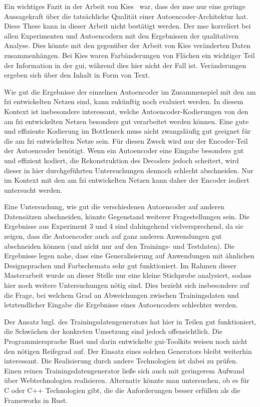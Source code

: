 Ein wichtiges Fazit in der Arbeit von Kies~\cite{kiesEntwicklungUndAnalyse2020} war, dass der \gls{mse} nur eine geringe Aussagekraft über die tatsächliche Qualität einer Autoencoder-Architektur hat. Diese These kann in dieser Arbeit nicht bestätigt werden. Der \gls{mse} korreliert bei allen Experimenten und Autoencodern mit den Ergebnissen der qualitativen Analyse. Dies könnte mit den gegenüber der Arbeit von Kies veränderten Daten zusammenhängen. Bei Kies waren Farbänderungen von Flächen ein wichtiger Teil der Information in der \gls{gui}, während dies hier nicht der Fall ist. Veränderungen ergeben sich über den Inhalt in Form von Text.

Wie gut die Ergebnisse der einzelnen Autoencoder im Zusammenspiel mit den am \gls{fzi} entwickelten Netzen sind, kann zukünftig noch evaluiert werden. In diesem Kontext ist insbesondere interessant, welche Autoencoder-Kodierungen von den am \gls{fzi} entwickelten Netzen besonders gut verarbeitet werden können. Eine gute und effiziente Kodierung im Bottleneck muss nicht zwangsläufig gut geeignet für die am \gls{fzi} entwickelten Netze sein. Für diesen Zweck wird nur der Encoder-Teil der Autoencoder benötigt. Wenn ein Autoencoder eine Eingabe besonders gut und effizient kodiert, die Rekonstruktion des Decoders jedoch scheitert, wird dieser in hier durchgeführten Untersuchungen dennoch schlecht abschneiden. Nur im Kontext mit den am \gls{fzi} entwickelten Netzen kann daher der Encoder isoliert untersucht werden.

Eine Untersuchung, wie gut die verschiedenen Autoencoder auf anderen Datensätzen abschneiden, könnte Gegenstand weiterer Fragestellungen sein. Die Ergebnisse aus Experiment 3 und 4 sind dahingehend vielversprechend, da sie zeigen, dass die Autoencoder auch auf ganz anderen Anwendungen gut abschneiden können (und nicht nur auf den Trainings- und Testdaten). Die Ergebnisse legen nahe, dass eine Generalisierung auf Anwendungen mit ähnlichen Designsprachen und Farbschemata sehr gut funktioniert. Im Rahmen dieser Masterarbeit wurde an dieser Stelle nur eine kleine Stichprobe analysiert, sodass hier noch weitere Untersuchungen nötig sind. Dies bezieht sich insbesondere auf die Frage, bei welchem Grad an Abweichungen zwischen Trainingsdaten und letztendlicher Eingabe die Ergebnisse eines Autoencoders schlechter werden.

Der Ansatz bzgl. des Trainingsdatengenerators hat hier in Teilen gut funktioniert, die Schwächen der konkreten Umsetzung sind jedoch offensichtlich. Die Programmiersprache Rust und darin entwickelte \gls{gui}-Toolkits weisen noch nicht den nötigen Reifegrad auf. Der Einsatz eines solchen Generators bleibt weiterhin interessant. Die Realisierung durch andere Technologien ist dabei zu prüfen. Einen reinen Trainingsdatengenerator ließe sich auch mit geringerem Aufwand über Webtechnologien realisieren. Alternativ könnte man untersuchen, ob es für C oder C++ Technologien gibt, die die Anforderungen besser erfüllen als die Frameworks in Rust.

